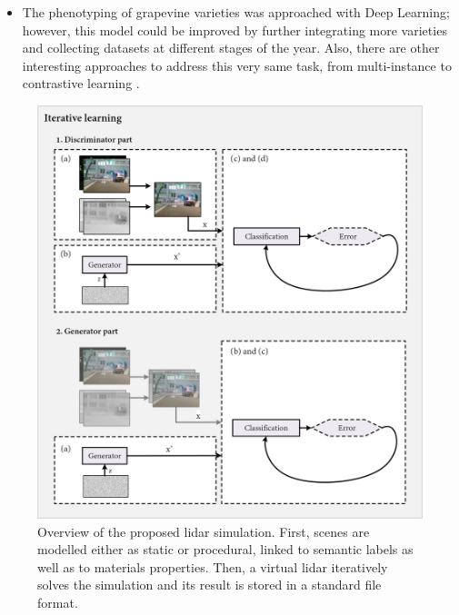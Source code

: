 \begin{itemize}
    \item The phenotyping of grapevine varieties was approached with Deep Learning; however, this model could be improved by further integrating more varieties and collecting datasets at different stages of the year. Also, there are other interesting approaches to address this very same task, from multi-instance \cite{meerdink_multitarget_2022} to contrastive learning \cite{guan_spatial-spectral_2022}. 
\end{itemize}

\begin{figure}[H]
    \centering
    \includegraphics[width=\linewidth]{figs/conclusions/gan.png}
    \caption{Overview of the proposed \acrshort{lidar} simulation. First, scenes are modelled either as static or procedural, linked to semantic labels as well as to materials properties. Then, a virtual \acrshort{lidar} iteratively solves the simulation and its result is stored in a standard file format.}
    \label{fig:conclusions_gan}
\end{figure}